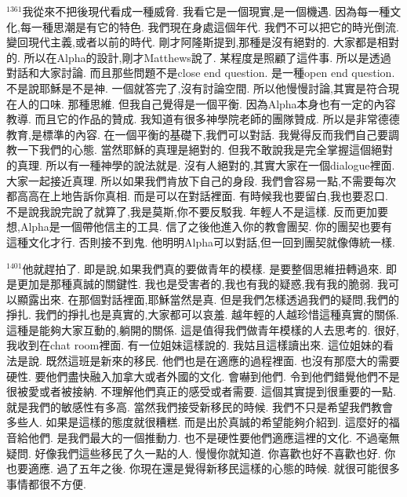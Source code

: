 \documentclass{book}
\begin{document}
$^{1361}$我從來不把後現代看成一種威脅.
我看它是一個現實,是一個機遇.
因為每一種文化,每一種思潮是有它的特色.
我們現在身處這個年代.
我們不可以把它的時光倒流.
變回現代主義,或者以前的時代.
剛才阿隆斯提到,那種是沒有絕對的.
大家都是相對的.
所以在Alpha的設計,剛才Matthews說了.
某程度是照顧了這件事.
所以是透過對話和大家討論.
而且那些問題不是close end question.
是一種open end question.
不是說耶穌是不是神.
一個就答完了,沒有討論空間.
所以他慢慢討論,其實是符合現在人的口味.
那種思維.
但我自己覺得是一個平衡.
因為Alpha本身也有一定的內容教導.
而且它的作品的贊成.
我知道有很多神學院老師的團隊贊成.
所以是非常德德教育,是標準的內容.
在一個平衡的基礎下,我們可以對話.
我覺得反而我們自己要調教一下我們的心態.
當然耶穌的真理是絕對的.
但我不敢說我是完全掌握這個絕對的真理.
所以有一種神學的說法就是.
沒有人絕對的,其實大家在一個dialogue裡面.
大家一起接近真理.
所以如果我們肯放下自己的身段.
我們會容易一點,不需要每次都高高在上地告訴你真相.
而是可以在對話裡面.
有時候我也要留白,我也要忍口.
不是說我說完說了就算了,我是莫斯,你不要反駁我.
年輕人不是這樣.
反而更加要想,Alpha是一個帶他信主的工具.
信了之後他進入你的教會團契.
你的團契也要有這種文化才行.
否則接不到鬼.
他明明Alpha可以對話,但一回到團契就像傳統一樣.

$^{1401}$他就趕拍了.
即是說,如果我們真的要做青年的模樣.
是要整個思維扭轉過來.
即是更加是那種真誠的關鍵性.
我也是受害者的,我也有我的疑惑,我有我的脆弱.
我可以顯露出來.
在那個對話裡面,耶穌當然是真.
但是我們怎樣透過我們的疑問,我們的掙扎.
我們的掙扎也是真實的,大家都可以哀羞.
越年輕的人越珍惜這種真實的關係.
這種是能夠大家互動的,躺開的關係.
這是值得我們做青年模樣的人去思考的.
很好,我收到在chat room裡面.
有一位姐妹這樣說的.
我姑且這樣讀出來.
這位姐妹的看法是說.
既然這班是新來的移民.
他們也是在適應的過程裡面.
也沒有那麼大的需要硬性.
要他們盡快融入加拿大或者外國的文化.
會嚇到他們.
令到他們錯覺他們不是很被愛或者被接納.
不理解他們真正的感受或者需要.
這個其實提到很重要的一點.
就是我們的敏感性有多高.
當然我們接受新移民的時候.
我們不只是希望我們教會多些人.
如果是這樣的態度就很糟糕.
而是出於真誠的希望能夠介紹到.
這麼好的福音給他們.
是我們最大的一個推動力.
也不是硬性要他們適應這裡的文化.
不過毫無疑問.
好像我們這些移民了久一點的人.
慢慢你就知道.
你喜歡也好不喜歡也好.
你也要適應.
過了五年之後.
你現在還是覺得新移民這樣的心態的時候.
就很可能很多事情都很不方便.
\end{document}

